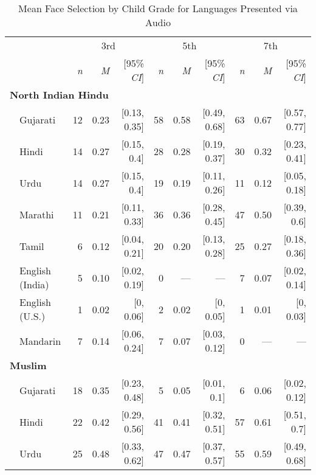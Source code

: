 \begin{table}[t]
\centering
\caption{Mean Face Selection by Child Grade for Languages Presented via Audio}
\begin{footnotesize}
\label{tab:face-audio-means}
\begin{tabular}{p{.1in}lrrrrrrrrr}
\toprule
 &  & \multicolumn{3}{c}{3rd} & \multicolumn{3}{c}{5th} & \multicolumn{3}{c}{7th} \\
\cline{3-5} \cline{6-8} \cline{9-11}
&  & \textit{n} & \textit{M} & [95\% \textit{CI}] &  \textit{n} & \textit{M} & [95\% \textit{CI}] &  \textit{n}  & \textit{M} & [95\% \textit{CI}]\\
\midrule
\multicolumn{11}{l}{\textbf{North Indian Hindu}}\\
& Gujarati & 12 & 0.23 & [0.13, 0.35] & 58 & 0.58 & [0.49, 0.68] & 63 & 0.67 & [0.57, 0.77]\\

 & Hindi & 14 & 0.27 & [0.15, 0.4] & 28 & 0.28 & [0.19, 0.37] & 30 & 0.32 & [0.23, 0.41]\\

 & Urdu & 14 & 0.27 & [0.15, 0.4] & 19 & 0.19 & [0.11, 0.26] & 11 & 0.12 & [0.05, 0.18]\\

 & Marathi & 11 & 0.21 & [0.11, 0.33] & 36 & 0.36 & [0.28, 0.45] & 47 & 0.50 & [0.39, 0.6]\\

 & Tamil & 6 & 0.12 & [0.04, 0.21] & 20 & 0.20 & [0.13, 0.28] & 25 & 0.27 & [0.18, 0.36]\\

 & English (India) & 5 & 0.10 & [0.02, 0.19] & 0 & --- & --- & 7 & 0.07 & [0.02, 0.14]\\

 & English (U.S.) & 1 & 0.02 & [0, 0.06] & 2 & 0.02 & [0, 0.05] & 1 & 0.01 & [0, 0.03]\\

 & Mandarin & 7 & 0.14 & [0.06, 0.24] & 7 & 0.07 & [0.03, 0.12] & 0 & --- & ---\\
\midrule
\multicolumn{11}{l}{\textbf{Muslim}}\\
& Gujarati & 18 & 0.35 & [0.23, 0.48] & 5 & 0.05 & [0.01, 0.1] & 6 & 0.06 & [0.02, 0.12]\\

 & Hindi & 22 & 0.42 & [0.29, 0.56] & 41 & 0.41 & [0.32, 0.51] & 57 & 0.61 & [0.51, 0.7]\\

 & Urdu & 25 & 0.48 & [0.33, 0.62] & 47 & 0.47 & [0.37, 0.57] & 55 & 0.59 & [0.49, 0.68]\\


\end{tabular}
\end{footnotesize}
\end{table}
